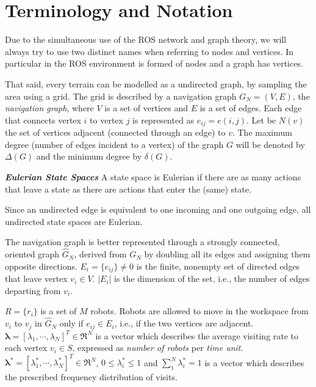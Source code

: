\section{Terminology and Notation}\label{sec:terminology}

Due to the simultaneous use of the ROS network and graph theory, we will always try to use two distinct names when referring to nodes and vertices. In particular in the ROS environment is formed of nodes and a graph has vertices.

That said, every terrain can be modelled as a undirected graph, by sampling the area using a grid.
The grid is described by a navigation graph $G_N=(V,E)$, the \emph{navigation graph}, where $V$ is a set of vertices and $E$ is a set of edges. Each edge that connects vertex $i$ to vertex $j$ is represented as $e_{ij}=e(i,j)$. Let be $N(v)$ the set of vertices adjacent (connected through an edge) to $v$. The maximum degree (number of edges incident to a vertex) of the graph $G$ will be denoted by $\Delta (G)$ and the minimum degree by $\delta (G)$.


\theoremstyle{definition}
\begin{definition}{\textbf{\textit{Eulerian State Spaces}}}\label{cellDec}
A state space is Eulerian if  there are as many actions  that leave a state as there are actions that enter the (same) state.
\end{definition}

Since an undirected edge is equivalent to one incoming and one outgoing edge, all undirected state spaces are Eulerian.

The navigation graph is better represented through a strongly connected, oriented graph $\hat{G}_N$, derived from $G_N$ by doubling all its edges and assigning them opposite directions. 
$E_i=\{e_{ij}\} \neq 0$ is the finite, nonempty set of directed edges that leave vertex $v_i \in V$.  $|E_i|$ is the dimension of the set, i.e., the number of edges departing from $v_i$.

$R=\{r_i\}$ is a set of $M$ robots. Robots are allowed to move in the workspace from $v_i$ to $v_j$ in $\hat{G}_N$ only if $e_{ij} \in E_i$, i.e., if the two vertices are adjacent. 
${\bm{\lambda}}=[\lambda_1,\cdots,\lambda_N]^T  \in \Re^N$ is a vector which describes the average visiting rate to each vertex $v_i \in S$, expressed as \textit{number of robots} per \textit{time unit}. %
${\bm{\lambda}}^*=[\lambda_1^*,\cdots,\lambda_N^*]^T  \in \Re^N$, $0 \le \lambda_i^* \le 1$ and $\sum \nolimits_1^N \lambda_i^* =1$ is a vector which describes the prescribed frequency distribution of visits. 

